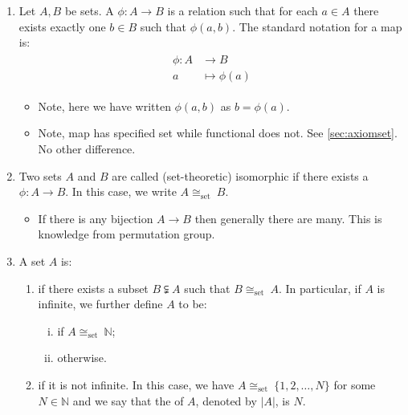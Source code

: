 \documentclass{article}
\begin{document}
\begin{enumerate}
    \item  Let $A, B$ be sets. A  $\phi: A \rightarrow B$ is a relation such that for each $a \in A$ there exists exactly one $b \in B$ such that $\phi(a, b)$.
The standard notation for a map is:
\begin{align*}
\begin{aligned}
\phi: A & \rightarrow B \\
a & \mapsto \phi(a)
\end{aligned}
\end{align*}
\begin{itemize}
    \item Note, here we have written $\phi(a, b)$  as $b= \phi(a)$. 
    \item Note, map has specified set while functional does not. See \cref{sec:axiomset}. No other difference.
\end{itemize}

\item {} Two sets $A$ and $B$ are called (set-theoretic) isomorphic if there exists a  $\phi: A \rightarrow B$. In this case, we write $A \cong_{\text {set }} B$.
\begin{itemize}
    \item If there is any bijection $A \rightarrow B$ then generally there are many. This is knowledge from permutation group.
\end{itemize}

\item {} A set $A$ is: 
\begin{enumerate}
    \item {} if there exists a  subset $B \subsetneqq A$ such that $B \cong_{\text {set }} A$. In particular, if $A$ is infinite, we further define $A$ to be:
    \begin{enumerate}[i).]
        \item {} if $A \cong_{\text {set }} \mathbb{N}$;
        \item {} otherwise.
    \end{enumerate}
    \item  {} if it is not infinite. In this case, we have $A  \cong_{\text {set }}\{1,2, \ldots, N\}$ for some $N \in \mathbb{N}$ and we say that the  of $A$, denoted by $|A|$, is $N$.
\end{enumerate}


\end{enumerate}
\end{document}
